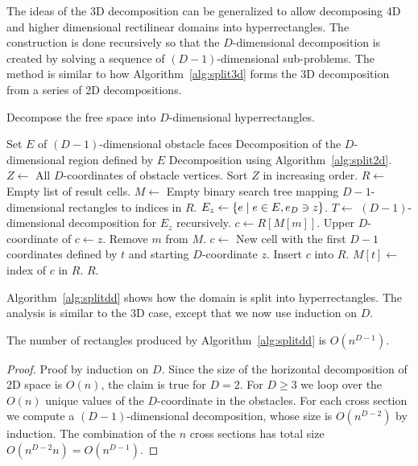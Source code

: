 \documentclass[english,gradu]{tktltiki2018}
\begin{document}
The ideas of the 3D decomposition can be generalized to allow decomposing 4D and higher dimensional rectilinear domains into hyperrectangles.
The construction is done recursively so that the $D$-dimensional decomposition is created by solving a sequence of $(D-1)$-dimensional sub-problems.
The method is similar to how Algorithm~\ref{alg:split3d} forms the 3D decomposition from a series of 2D decompositions.

\begin{algorithm}
\caption{Decompose the free space into $D$-dimensional hyperrectangles.}
\label{alg:splitdd}
\begin{algorithmic}
\Require Set $E$ of $(D-1)$-dimensional obstacle faces
\Ensure Decomposition of the $D$-dimensional region defined by $E$
	\State \Return Decomposition using Algorithm~\ref{alg:split2d}.
\EndIf
\State $Z\gets$ All $D$-coordinates of obstacle vertices.
\State Sort $Z$ in increasing order.
\State $R\gets$ Empty list of result cells.
\State $M\gets$ Empty binary search tree mapping $D-1$-dimensional rectangles to indices in $R$.
	\State $E_z\gets\left\{e \mid e\in E, e_D\ni z\right\}$.
	\State $T\gets$ $(D-1)$-dimensional decomposition for $E_z$ recursively.
		\State $c\gets R[M[m]]$.
		\State Upper $D$-coordinate of $c\gets z$.
		\State Remove $m$ from $M$.
	\EndFor
		\State $c\gets$ New cell with the first $D-1$ coordinates defined by $t$ and starting $D$-coordinate $z$.
		\State Insert $c$ into $R$.
		\State $M[t]\gets$ index of $c$ in $R$.
	\EndFor
\EndFor
\State \Return $R$.
\end{algorithmic}
\end{algorithm}

Algorithm~\ref{alg:splitdd} shows how the domain is split into hyperrectangles.
The analysis is similar to the 3D case, except that we now use induction on $D$.

\begin{lem}\label{lem:splitddcells}The number of rectangles produced by Algorithm~\ref{alg:splitdd} is $O(n^{D-1})$.\end{lem}
\begin{proof}
Proof by induction on $D$.
Since the size of the horizontal decomposition of 2D space is $O(n)$, the claim is true for $D=2$.
For $D\ge 3$ we loop over the $O(n)$ unique values of the $D$-coordinate in the obstacles.
For each cross section we compute a $(D-1)$-dimensional decomposition, whose size is $O(n^{D-2})$ by induction.
The combination of the $n$ cross sections has total size $O(n^{D-2}n)=O(n^{D-1})$.
\end{proof}
\end{document}
